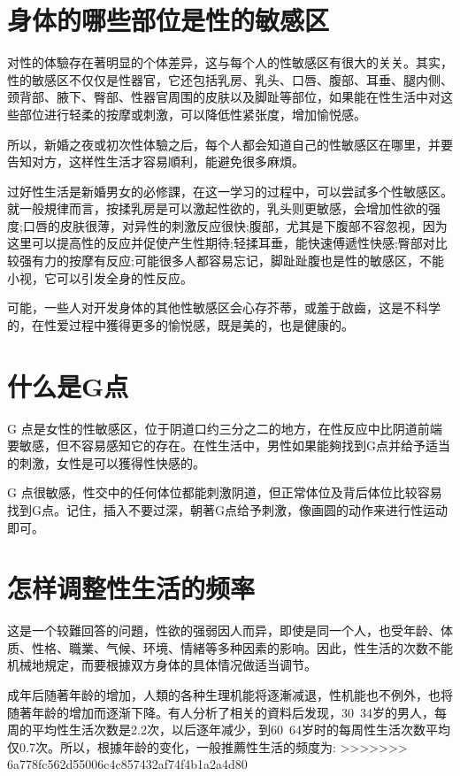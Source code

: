\documentclass[12pt,UTF8]{ctexbook}
\begin{document}
\section{身体的哪些部位是性的敏感区}

对性的体驗存在著明显的个体差异，这与每个人的性敏感区有很大的关关。其实，性的敏感区不仅仅是性器官，它还包括乳房、乳头、口唇、腹部、耳垂、腿内侧、颈背部、腋下、臀部、性器官周围的皮肤以及脚趾等部位，如果能在性生活中对这些部位进行轻柔的按摩或刺激，可以降低性紧张度，增加愉悦感。

所以，新婚之夜或初次性体驗之后，每个人都会知道自己的性敏感区在哪里，并要告知对方，这样性生活才容易順利，能避免很多麻煩。

过好性生活是新婚男女的必修課，在这一学习的过程中，可以尝試多个性敏感区。就一般規律而言，按揉乳房是可以激起性欲的，乳头则更敏感，会增加性欲的强度;口唇的皮肤很薄，对异性的刺激反应很快;腹部，尤其是下腹部不容忽视，因为这里可以提高性的反应并促使产生性期待;轻揉耳垂，能快速傅遞性快感;臀部对比较强有力的按摩有反应;可能很多人都容易忘记，脚趾趾腹也是性的敏感区，不能小视，它可以引发全身的性反应。

可能，一些人对开发身体的其他性敏感区会心存芥蒂，或羞于啟齒，这是不科学的，在性爱过程中獲得更多的愉悦感，既是美的，也是健康的。

\section{什么是G点}

G 点是女性的性敏感区，位于阴道口约三分之二的地方，在性反应中比阴道前端要敏感，但不容易感知它的存在。在性生活中，男性如果能夠找到G点并给予适当的刺激，女性是可以獲得性快感的。

G 点很敏感，性交中的任何体位都能刺激阴道，但正常体位及背后体位比较容易找到G点。记住，插入不要过深，朝著G点给予刺激，像画圆的动作来进行性运动即可。

\section{怎样调整性生活的频率}

这是一个较難回答的问題，性欲的强弱因人而异，即使是同一个人，也受年龄、体质、性格、職業、气候、环境、情緒等多种因素的影响。因此，性生活的次数不能机械地規定，而要根據双方身体的具体情况做适当调节。

成年后随著年龄的增加，人類的各种生理机能将逐漸减退，性机能也不例外，也将随著年龄的增加而逐渐下降。有人分析了相关的資料后发现，30~34岁的男人，每周的平均性生活次数是2.2次，以后逐年减少，到60~64岁时的每周性生活次数平均仅0.7次。所以，根據年龄的变化，一般推薦性生活的频度为:
>>>>>>> 6a778fc562d55006c4c857432af74f4b1a2a4d80
\end{document}
